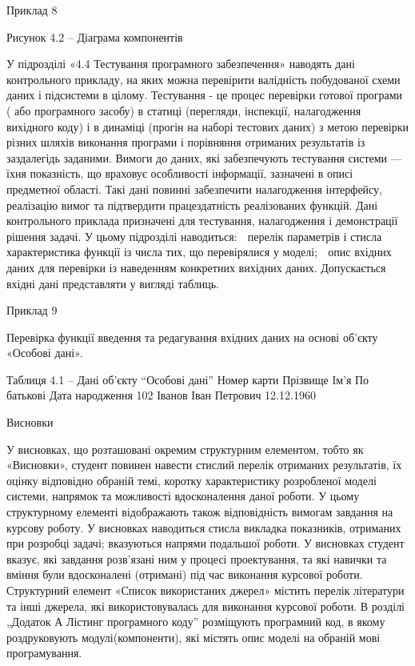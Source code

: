 Приклад 8 

 
Рисунок 4.2 – Діаграма компонентів

У підрозділі «4.4 Тестування програмного забезпечення» наводять дані контрольного прикладу, на яких можна перевірити валідність побудованої схеми даних і підсистеми в цілому. 
Тестування  - це процес перевірки готової програми ( або програмного засобу) в статиці (перегляди, інспекції, налагодження вихідного коду) і в динаміці (прогін на наборі тестових даних) з метою перевірки різних шляхів виконання програми і порівняння отриманих результатів із заздалегідь заданими. Вимоги до даних, які забезпечують тестування системи — їхня показність, що враховує особливості інформації, зазначені в описі предметної області. Такі дані повинні забезпечити налагодження інтерфейсу, реалізацію вимог та підтвердити працездатність реалізованих функцій. Дані контрольного приклада призначені для тестування, налагодження і демонстрації рішення задачі. 
У цьому підрозділі наводиться: 
	перелік параметрів і стисла характеристика функції із числа тих, що перевірялися у  моделі; 
	опис вхідних даних для перевірки із наведенням конкретних вихідних даних. Допускається вхідні дані представляти у вигляді таблиць.

Приклад 9

Перевірка функції введення та редагування вхідних даних на основі об’єкту «Особові дані».
 
Таблиця 4.1 – Дані  об’єкту “Особові дані”
Номер карти	Прізвище 	Ім’я 	По батькові 	Дата народження
102	Іванов	Іван	Петрович	12.12.1960

	Висновки
	
У висновках, що розташовані окремим структурним елементом, тобто як  «Висновки», студент повинен навести  стислий перелік отриманих результатів, їх оцінку відповідно обраній темі, коротку характеристику розробленої моделі системи, напрямок та можливості вдосконалення даної роботи. У цьому структурному елементі відображають також  відповідність вимогам завдання на курсову роботу.
	У висновках наводиться стисла викладка показників, отриманих при розробці задачі; вказуються напрями подальшої роботи.
У висновках студент вказує, які завдання розв’язані ним у процесі проектування, та які навички та вміння були вдосконалені (отримані) під час виконання курсової роботи. 
Структурний елемент «Список використаних джерел» містить перелік літератури та інші джерела, які використовувалась для виконання курсової роботи. 
В розділі „Додаток А Лістинг програмного коду” розміщують програмний код, в якому роздруковують модулі(компоненти), які містять  опис моделі на обраній мові програмування.

